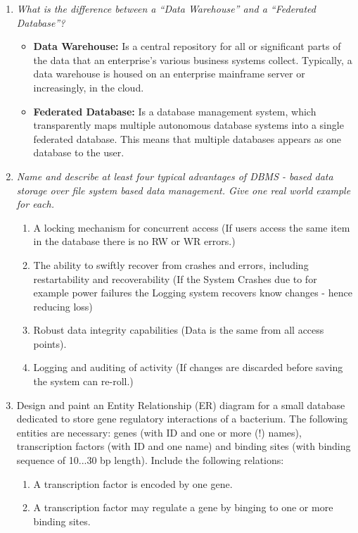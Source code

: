 \documentclass[a4paper,10pt,titlepage]{article}
\begin{document}
\begin{enumerate}
\item
\textit{What is the difference between a “Data Warehouse” and a “Federated Database”?}\\

\begin{itemize}
\item
\textbf{Data Warehouse:} Is a central repository for all or significant parts of the data that an enterprise's various business systems collect. Typically, a data warehouse is housed on an enterprise mainframe server or increasingly, in the cloud. 
\item
\textbf{Federated Database:} Is a database management system, which transparently maps multiple autonomous database systems into a single federated database. This means that multiple databases appears as one database to the user.
\end{itemize}

\item
\textit{Name and describe at least four typical advantages of DBMS - based data storage over file system based data management. Give one real world example for each.}\\

\begin{enumerate}
\item
A locking mechanism for concurrent access (If users access the same item in the database there is no RW or WR errors.)
\item
The ability to swiftly recover from crashes and errors, including restartability and recoverability (If the System Crashes due to for example power failures the Logging system recovers know changes - hence reducing loss)
\item
Robust data integrity capabilities (Data is the same from all access points).
\item
Logging and auditing of activity (If changes are discarded before saving the system can re-roll.)
\end{enumerate}

\item
Design and paint an Entity Relationship (ER) diagram for a small database dedicated to store gene regulatory interactions of a bacterium. The following entities are necessary: genes (with ID and one or more (!) names), transcription factors (with ID and one name) and binding sites (with binding sequence of 10...30 bp length). Include the following relations: 
\begin{enumerate}
\item 
A transcription factor is encoded by one gene. 
\item 
A transcription factor may regulate a gene by binging to one or more binding sites.
\end{enumerate}


\end{enumerate}
\end{document}
